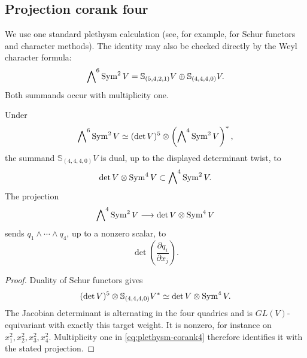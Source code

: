 \subsection{Projection corank four}

We use one standard plethysm calculation (see, for example,
\cite{FultonHarris} for Schur functors and character methods).  The
identity may also be checked directly by the Weyl character formula:
\begin{equation}\label{eq:plethysm-corank4}
 \bigwedge\nolimits^6\operatorname{Sym}^2V
 =
 \mathbb S_{(5,4,2,1)}V
 \oplus
 \mathbb S_{(4,4,4,0)}V.
\end{equation}
Both summands occur with multiplicity one.

\begin{lemma}
\label{lem:jacobian-projection}
Under
\[
 \bigwedge\nolimits^6\operatorname{Sym}^2V
 \simeq
 (\det V)^5\otimes
 \left(\bigwedge\nolimits^4\operatorname{Sym}^2V\right)^*,
\]
the summand
\(\mathbb S_{(4,4,4,0)}V\) is dual, up to the displayed determinant
twist, to
\[
 \det V\otimes\operatorname{Sym}^4V\subset
 \bigwedge\nolimits^4\operatorname{Sym}^2V.
\]
The projection
\[
 \bigwedge\nolimits^4\operatorname{Sym}^2V
 \longrightarrow
 \det V\otimes\operatorname{Sym}^4V
\]
sends \(q_1\wedge\cdots\wedge q_4\), up to a nonzero scalar, to
\[
 \det\left(\frac{\partial q_i}{\partial x_j}\right).
\]
\end{lemma}

\begin{proof}
Duality of Schur functors gives
\[
 (\det V)^5\otimes
 \mathbb S_{(4,4,4,0)}V^*
 \simeq
 \det V\otimes\operatorname{Sym}^4V.
\]
The Jacobian determinant is alternating in the four quadrics and is
\(GL(V)\)-equivariant with exactly this target weight.  It is nonzero,
for instance on
\(x_1^2,x_2^2,x_3^2,x_4^2\).  Multiplicity one in
\eqref{eq:plethysm-corank4} therefore identifies it with the stated
projection.
\end{proof}

